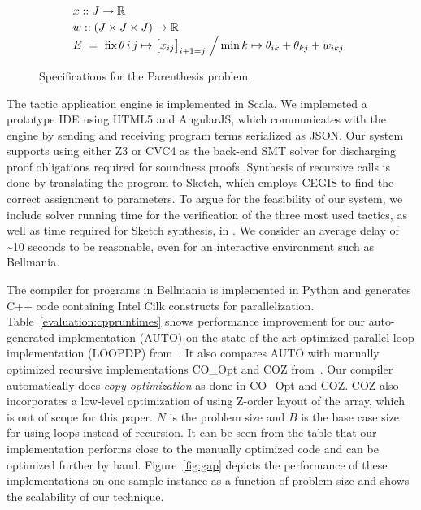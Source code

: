 \begin{figure}
\[
  \renewcommand\arraystretch{1.2}
  \begin{array}{@{}l@{}l}
    \lspan2{x :: J\to\R} \\
    \lspan2{w :: (J\times J\times J)\to\R} \\
    E ~=~ \fix \theta\,i\,j\mapsto{}
      & {\big[x_{ij}\big]_{i+1=j} ~\Big/} 
       \min k\mapsto\theta_{ik}+\theta_{kj}+w_{ikj} \\
  \end{array}
\]
\caption{\label{evaluation:paren spec}
  Specifications for the Parenthesis problem.}
\end{figure}


The tactic application engine is implemented in Scala. We implemeted a prototype
IDE using HTML5 and AngularJS, which communicates with the engine by sending
and receiving program terms serialized as JSON. Our system supports using either
Z3 or CVC4 as the back-end SMT solver for discharging proof obligations required
for soundness proofs. Synthesis of recursive calls is done by translating the
program to Sketch, which employs CEGIS to find the correct assignment to parameters.
To argue for the feasibility of our system, we include
solver running time for the verification of the three most used tactics,
as well as time required for Sketch synthesis, in .
We consider an average delay of \textasciitilde 10 seconds to be reasonable, even for an interactive
environment such as Bellmania. 

The compiler for programs in Bellmania is implemented in 
Python and generates C++ code containing Intel Cilk constructs for parallelization.
Table~\ref{evaluation:cppruntimes} shows performance improvement for our 
auto-generated implementation (AUTO) on the state-of-the-art optimized parallel
loop implementation (LOOPDP) from~\cite{IPDPS15/Tithi}. It also compares AUTO with manually 
optimized recursive implementations CO\_Opt and COZ from~\cite{IPDPS15/Tithi}. 
Our compiler automatically does \textit{copy optimization} 
as done in CO\_Opt and COZ. COZ also incorporates a low-level 
optimization of using Z-order layout of the array,
which is out of scope for this paper. %
$N$ is the problem size and $B$ is the base case size for using loops 
instead of recursion. It can be seen from the table that our implementation 
performs close to the manually optimized code and can be optimized further by 
hand. Figure~\ref{fig:gap} depicts the performance of these implementations 
on one sample instance
as a function of problem size and shows the scalability of our technique. %

